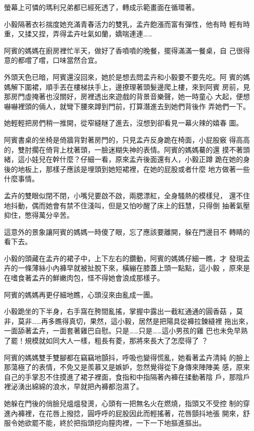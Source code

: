 螢幕上可憐的瑪利兄弟都已經死透了，轉成示範畫面在循環著。

小毅隔著衣衫揣度她充滿青春活力的雙乳，孟卉飽漲而富有彈性，他有時
輕有時重，又揉又捏，弄得孟卉吐氣如蘭，嬌喘連連……

阿賓的媽媽在廚房裡忙半天，做好了香噴噴的晚餐，擺得滿滿一餐桌，自
己很得意的都嚐了嚐，口味當然合宜。

外頭天色已暗，阿賓還沒回來，她於是想去問孟卉和小毅要不要先吃。阿
賓的媽媽解下圍裙，順手丟在樓梯扶手上，邊撩理著頭髮邊爬上樓，來到阿賓
房前，見那房門虛掩著也沒關好，房裡透出來遊戲的背景音樂聲，她一時童心
大起，便想嚇嚇裡頭的倆人，就彎下腰來蹲到門前，打算潛進去到她們背後作
弄她們一下。

她輕輕把房們稍一推開，從窄縫瞇了進去，沒想到卻看見一幕火辣的嬉春
圖。

阿賓書桌的坐椅是倚牆背對著房門的，只見孟卉反身跪在椅面，小屁股竅
得高高的，雙肘擱在倚背上枕著頭，一臉迷糊失神的表情。阿賓的媽媽驀的還
摸不著頭緒，這小娃兒在幹什麼？仔細一看，原來孟卉後面還有人，小毅正蹲
跪在她的身後的地板上，那樣子應該是埋頭到她短裙裡，在她的屁股或者什麼
地方做著一些什麼事情。

孟卉的雙眼似閉不閉，小嘴兒要啟不啟，兩腮漂紅，全身騷熱的模樣兒，
還不住地抖動，偶而她會有禁不住淺叫，但是又怕吵醒了床上的鈺慧，只得倒
抽著氣壓抑住，憋得萬分辛苦。

這意外的景象讓阿賓的媽媽一時傻了眼，忘了應該要離開，躲在門邊目不
轉睛的看下去。

小毅的頭藏在孟卉的裙子中，上下左右的鑽動，阿賓的媽媽仔細一瞧，才
發現孟卉的一條薄絲小內褲早就被扯脫下來，橫繃在膝蓋上頭一點點，這小毅
，原來是在嗜食著孟卉的鮮嫩肉包，怪不得她會浪成那樣子。

阿賓的媽媽再更仔細地瞧，心頭沒來由亂成一團。

小毅跪坐的下半身，右手窩在胯間亂搖，掌握中露出一截紅通通的圓香菇
，莫非，莫非……再多瞧得真切，果然，這小毅，居然是把陽具從褲拉鍊縫裡
拖出來，一面舔著孟卉，一面套著雞巴自慰。只是……只是……這小男孩的雞
巴也未免早熟了罷！規模就如同大人一樣，粗長有菱，那將來長大了怎麼得了
？

阿賓的媽媽雙手雙腳都在竊竊地顫抖，呼吸也變得慌亂，她看著孟卉清純
的臉上那蕩極了的表情，不免又是羨慕又是嫉妒，忽然覺得從下身傳來陣陣美
感，原來自己的手掌忍不住摸進了裙子裡面，食指和中指隔著內褲在揉動著陰
戶，那陰戶裡泌湧出綿綿的浪水，早就把內褲都泡濕了。

她躲在門後的俏臉兒熅熅發燙，心頭有一把無名火在燃燒，指頭又不受控
制的穿進內褲裡，在花唇上撥捻，圓呼呼的屁股因此而輕搖著，花唇顫抖地張
開來，舒服令她欲罷不能，終於把指頭挖向膣肉裡，一下一下地摳進摳出。

